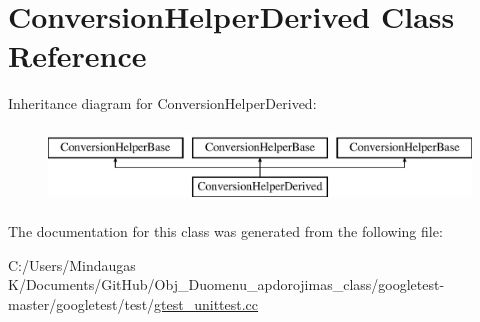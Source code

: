 \hypertarget{class_conversion_helper_derived}{}\section{Conversion\+Helper\+Derived Class Reference}
\label{class_conversion_helper_derived}
Inheritance diagram for Conversion\+Helper\+Derived\+:\begin{figure}[H]
\begin{center}
\leavevmode
\includegraphics[height=2.000000cm]{d3/dfd/class_conversion_helper_derived}
\end{center}
\end{figure}


The documentation for this class was generated from the following file\+:\begin{DoxyCompactItemize}
\item 
C\+:/\+Users/\+Mindaugas K/\+Documents/\+Git\+Hub/\+Obj\+\_\+\+Duomenu\+\_\+apdorojimas\+\_\+class/googletest-\/master/googletest/test/\mbox{\hyperlink{googletest-master_2googletest_2test_2gtest__unittest_8cc}{gtest\+\_\+unittest.\+cc}}\end{DoxyCompactItemize}
